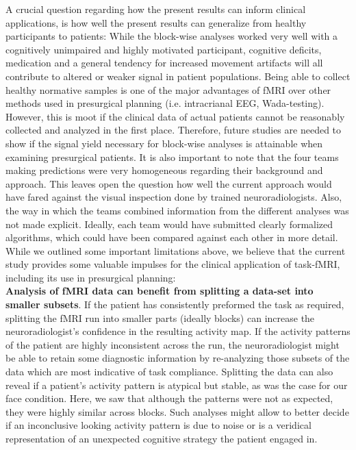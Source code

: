 \documentclass[fleqn,10pt]{SelfArx} %
\begin{document}
A crucial question regarding how the present results can inform clinical applications, is how well the present results can generalize from healthy participants to patients: While the block-wise analyses worked very well with a cognitively unimpaired and highly motivated participant, cognitive deficits, medication and a general tendency for increased movement artifacts \citep{Van_Dijk_2012} will all contribute to altered or weaker signal in patient populations. Being able to collect healthy normative samples \citep{Dubois_2016} is one of the major advantages of fMRI over other methods used in presurgical planning (i.e. intracrianal EEG, Wada-testing). However, this is moot if the clinical data of actual patients cannot be reasonably collected and analyzed in the first place. Therefore, future studies are needed to show if the signal yield necessary for block-wise analyses is attainable when examining presurgical patients.
It is also important to note that the four teams making predictions were very homogeneous regarding their background and approach. This leaves open the question how well the current approach would have fared against the visual inspection done by trained neuroradiologists. Also, the way in which the teams combined information from the different analyses was not made explicit. Ideally, each team would have submitted clearly formalized algorithms, which could have been compared against each other in more detail.
While we outlined some important limitations above, we believe that the current study provides some valuable impulses for the clinical application of task-fMRI, including its use in presurgical planning:\\
\textbf{Analysis of fMRI data can benefit from splitting a data-set into smaller subsets}. If the patient has consistently preformed the task as required, splitting the fMRI run into smaller parts (ideally blocks) can increase the neuroradiologist's confidence in the resulting activity map. If the activity patterns of the patient are highly inconsistent across the run, the neuroradiologist might be able to retain some diagnostic information by re-analyzing those subsets of the data which are most indicative of task compliance. Splitting the data can also reveal if a patient's activity pattern is atypical but stable, as was the case for our face condition. Here, we saw that although the patterns were not as expected, they were highly similar across blocks. Such analyses might allow to better decide if an inconclusive looking activity pattern is due to noise or is a veridical representation of an unexpected cognitive strategy the patient engaged in.\\
\end{document}
